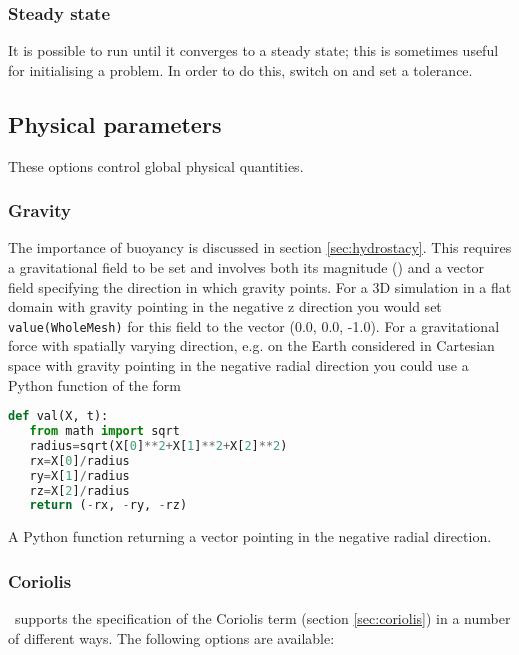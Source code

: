 \subsubsection{Steady state}
It is possible to run \fluidity until it converges to a steady state; this is sometimes useful for initialising a problem. In order to do this, switch on  and set a tolerance. 

\subsection{Physical parameters}
These options control global physical quantities.

\subsubsection{Gravity}\label{sec:Gravity}
The importance of buoyancy is discussed in section \ref{sec:hydrostacy}. This
requires a gravitational field to be set and involves both its magnitude
(\eg \mss[9.8]) and a vector field specifying the direction in which gravity
points. For a 3D simulation in a flat domain with gravity pointing in the
negative z direction you would set \verb+value(WholeMesh)+ for this field to
the vector (0.0, 0.0, -1.0). For a gravitational force with spatially
varying direction, e.g. on the Earth considered in Cartesian space with
gravity pointing in the negative radial direction you could use a Python
function of the form
\begin{example}
  \begin{lstlisting}[language=Python]
def val(X, t):
   from math import sqrt
   radius=sqrt(X[0]**2+X[1]**2+X[2]**2)
   rx=X[0]/radius
   ry=X[1]/radius
   rz=X[2]/radius
   return (-rx, -ry, -rz)
  \end{lstlisting}
  \caption{A Python function returning a vector pointing in the negative radial direction.}
\end{example}

\subsubsection{Coriolis}

\fluidity\ supports the specification of the Coriolis term (section
\ref{sec:coriolis}) in a number of different ways. The following options
are available:

